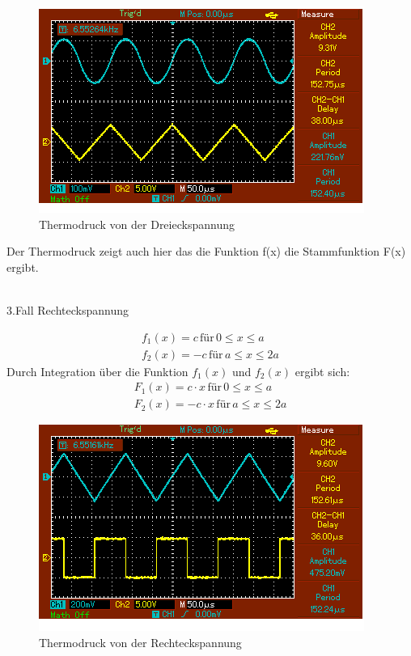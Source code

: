 \begin{figure}[H]
  \centering
  \includegraphics[width=\textwidth]{Dr1.png}
  \caption{Thermodruck von der Dreieckspannung}
  \label{fig:11}
\end{figure}
Der Thermodruck zeigt auch hier das die Funktion f(x) die Stammfunktion F(x) ergibt.\\\\
\centerline{3.Fall Rechteckspannung}
\begin{align*}
f_1 (x) =  c \, \text{für} \, 0 \leq x \leq a \\
f_2 (x) =  -c \, \text{für} \, a\leq x \leq 2a
\end{align*}
Durch Integration über die Funktion $f_1 (x)$ und $f_2 (x)$ ergibt sich:
\begin{align*}
  F_1 (x) =  c\cdot x \, \text{für} \, 0 \leq x \leq a \\
  F_2 (x) =  -c\cdot x \, \text{für} \, a\leq x \leq 2a
\end{align*}
\begin{figure}[H]
  \centering
  \includegraphics[width=\textwidth]{Re.png}
  \caption{Thermodruck von der Rechteckspannung}
  \label{fig:12}
 \end{figure}
